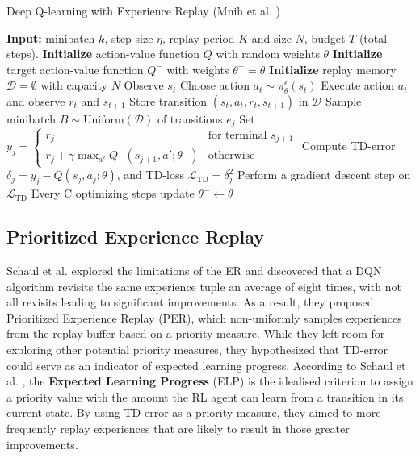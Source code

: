 \begin{algorithm}[h]
\caption{Deep Q-learning with Experience Replay (Mnih et al. \cite{mnih2013playing, mnih2015human})}
\label{algorithm:dqn}
\begin{algorithmic}[1]
\State \textbf{Input:} minibatch $k$, step-size $\eta$, replay period $K$ and size $N$, budget $T$ (total steps).
\State \textbf{Initialize} action-value function $Q$ with random weights $\theta$
\State \textbf{Initialize} target action-value function $Q^-$ with weights $\theta^- = \theta$
\State \textbf{Initialize} replay memory $\mathcal{D} = \emptyset$ with capacity $N$ %
    \State Observe $s_t$
    \State Choose action $a_t \sim \pi^\epsilon_\theta(s_t)$
    \State Execute action $a_t$ and observe $r_t$ and $s_{t+1}$
    \State Store transition $(s_t, a_t, r_t, s_{t+1})$ in $\mathcal{D}$
        \State Sample minibatch $B \sim \text{Uniform}(\mathcal{D})$ of transitions $e_j$
        \State Set $y_j = 
        \begin{cases} 
            r_j & \text{for terminal } s_{j+1}\\
            r_j + \gamma \max_{a'} Q^-(s_{j+1}, a'; \theta^-) & \text{otherwise}
        \end{cases}$
        \State Compute TD-error $\delta_j = y_j - Q(s_{j}, a_{j}; \theta)$, and TD-loss $\mathcal{L}_{\text{TD}} = \delta_j^2 $
        \State Perform a gradient descent step on $\mathcal{L}_{\text{TD}}$
        \State Every C optimizing steps update $\theta^- \leftarrow \theta$
\EndFor
\end{algorithmic}
\end{algorithm}

\subsection{Prioritized Experience Replay}
\label{sec:per}
Schaul et al. \cite{schaul2015prioritized} explored the limitations of the ER and discovered that a DQN algorithm revisits the same experience tuple an average of eight times, with not all revisits leading to significant improvements. As a result, they proposed Prioritized Experience Replay (PER), which non-uniformly samples experiences from the replay buffer based on a priority measure. While they left room for exploring other potential priority measures, they hypothesized that TD-error could serve as an indicator of expected learning progress. According to Schaul et al. \cite{schaul2015prioritized}, the \textbf{Expected Learning Progress} (ELP) is the idealised criterion to assign a priority value with the amount the RL agent can learn from a transition in its current state. By using TD-error as a priority measure, they aimed to more frequently replay experiences that are likely to result in those greater improvements.

